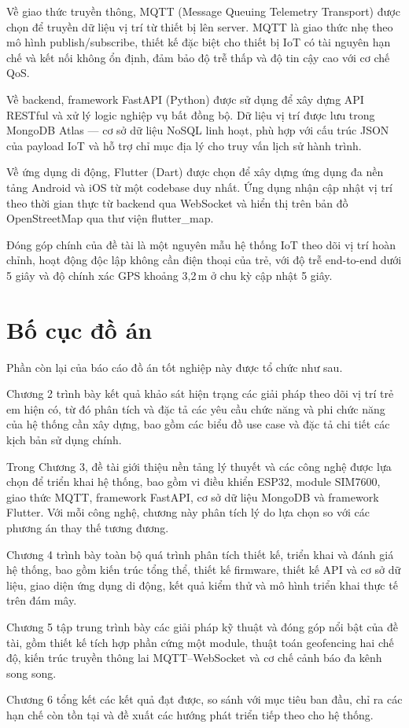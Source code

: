 \documentclass[../DoAn.tex]{subfiles}
\begin{document}
Về giao thức truyền thông, MQTT (Message Queuing Telemetry Transport) được chọn để truyền dữ liệu vị trí từ thiết bị lên server. MQTT là giao thức nhẹ theo mô hình publish/subscribe, thiết kế đặc biệt cho thiết bị IoT có tài nguyên hạn chế và kết nối không ổn định, đảm bảo độ trễ thấp và độ tin cậy cao với cơ chế QoS.

Về backend, framework FastAPI (Python) được sử dụng để xây dựng API RESTful và xử lý logic nghiệp vụ bất đồng bộ. Dữ liệu vị trí được lưu trong MongoDB Atlas — cơ sở dữ liệu NoSQL linh hoạt, phù hợp với cấu trúc JSON của payload IoT và hỗ trợ chỉ mục địa lý cho truy vấn lịch sử hành trình.

Về ứng dụng di động, Flutter (Dart) được chọn để xây dựng ứng dụng đa nền tảng Android và iOS từ một codebase duy nhất. Ứng dụng nhận cập nhật vị trí theo thời gian thực từ backend qua WebSocket và hiển thị trên bản đồ OpenStreetMap qua thư viện flutter\_map.

Đóng góp chính của đề tài là một nguyên mẫu hệ thống IoT theo dõi vị trí hoàn chỉnh, hoạt động độc lập không cần điện thoại của trẻ, với độ trễ end-to-end dưới 5 giây và độ chính xác GPS khoảng 3{,}2\,m ở chu kỳ cập nhật 5 giây.

\section{Bố cục đồ án}
\label{section:1.4}

Phần còn lại của báo cáo đồ án tốt nghiệp này được tổ chức như sau.

Chương 2 trình bày kết quả khảo sát hiện trạng các giải pháp theo dõi vị trí trẻ em hiện có, từ đó phân tích và đặc tả các yêu cầu chức năng và phi chức năng của hệ thống cần xây dựng, bao gồm các biểu đồ use case và đặc tả chi tiết các kịch bản sử dụng chính.

Trong Chương 3, đề tài giới thiệu nền tảng lý thuyết và các công nghệ được lựa chọn để triển khai hệ thống, bao gồm vi điều khiển ESP32, module SIM7600, giao thức MQTT, framework FastAPI, cơ sở dữ liệu MongoDB và framework Flutter. Với mỗi công nghệ, chương này phân tích lý do lựa chọn so với các phương án thay thế tương đương.

Chương 4 trình bày toàn bộ quá trình phân tích thiết kế, triển khai và đánh giá hệ thống, bao gồm kiến trúc tổng thể, thiết kế firmware, thiết kế API và cơ sở dữ liệu, giao diện ứng dụng di động, kết quả kiểm thử và mô hình triển khai thực tế trên đám mây.

Chương 5 tập trung trình bày các giải pháp kỹ thuật và đóng góp nổi bật của đề tài, gồm thiết kế tích hợp phần cứng một module, thuật toán geofencing hai chế độ, kiến trúc truyền thông lai MQTT–WebSocket và cơ chế cảnh báo đa kênh song song.

Chương 6 tổng kết các kết quả đạt được, so sánh với mục tiêu ban đầu, chỉ ra các hạn chế còn tồn tại và đề xuất các hướng phát triển tiếp theo cho hệ thống.
\end{document}
